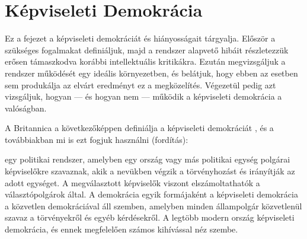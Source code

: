 \section{Képviseleti Demokrácia}

Ez a fejezet a képviseleti demokráciát és hiányosságait tárgyalja. Először a szükséges
fogalmakat definiáljuk, majd a rendszer alapvető hibáit részletezzük erősen támaszkodva
korábbi intellektuális kritikákra. Ezután megvizsgáljuk a rendszer működését egy ideális
környezetben, és belátjuk, hogy ebben az esetben sem produkálja az elvárt eredményt ez
a megközelítés. Végezetül pedig azt vizsgáljuk, hogyan --- és hogyan nem --- működik
a képviseleti demokrácia a valóságban.

A Britannica a következőképpen definiálja a képviseleti demokráciát \cite{rep_dem_def},
és a továbbiakban mi is ezt fogjuk használni (fordítás):

\begin{displayquote} egy politikai rendszer, amelyben egy ország vagy más politikai
	egység polgárai képviselőkre szavaznak, akik a nevükben végzik a törvényhozást és
	irányítják az adott egységet. A megválasztott képviselők viszont elszámoltathatók
	a választópolgárok által. A demokrácia egyik formájaként a képviseleti demokrácia a
	közvetlen demokráciával áll szemben, amelyben minden állampolgár közvetlenül szavaz a
	törvényekről és egyéb kérdésekről.  A legtöbb modern ország képviseleti demokrácia,
	és ennek megfelelően számos kihívással néz szembe.  
\end{displayquote}

